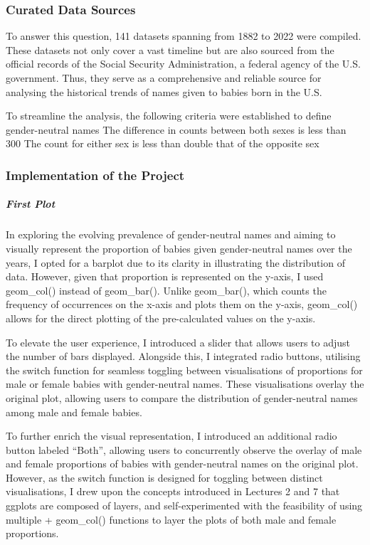 \documentclass[
]{article}
\begin{document}
\hypertarget{curated-data-sources}{%
\subsubsection{Curated Data Sources}\label{curated-data-sources}}

To answer this question, 141 datasets spanning from 1882 to 2022 were
compiled. These datasets not only cover a vast timeline but are also
sourced from the official records of the Social Security Administration,
a federal agency of the U.S. government. Thus, they serve as a
comprehensive and reliable source for analysing the historical trends of
names given to babies born in the U.S.

To streamline the analysis, the following criteria were established to
define gender-neutral names The difference in counts between both sexes
is less than 300 The count for either sex is less than double that of
the opposite sex

\hypertarget{implementation-of-the-project}{%
\subsubsection{Implementation of the
Project}\label{implementation-of-the-project}}

\hypertarget{first-plot}{%
\subparagraph{\texorpdfstring{\textbf{First
Plot}}{First Plot}}\label{first-plot}}

In exploring the evolving prevalence of gender-neutral names and aiming
to visually represent the proportion of babies given gender-neutral
names over the years, I opted for a barplot due to its clarity in
illustrating the distribution of data. However, given that proportion is
represented on the y-axis, I used geom\_col() instead of geom\_bar().
Unlike geom\_bar(), which counts the frequency of occurrences on the
x-axis and plots them on the y-axis, geom\_col() allows for the direct
plotting of the pre-calculated values on the y-axis.

To elevate the user experience, I introduced a slider that allows users
to adjust the number of bars displayed. Alongside this, I integrated
radio buttons, utilising the switch function for seamless toggling
between visualisations of proportions for male or female babies with
gender-neutral names. These visualisations overlay the original plot,
allowing users to compare the distribution of gender-neutral names among
male and female babies.

To further enrich the visual representation, I introduced an additional
radio button labeled ``Both'', allowing users to concurrently observe
the overlay of male and female proportions of babies with gender-neutral
names on the original plot. However, as the switch function is designed
for toggling between distinct visualisations, I drew upon the concepts
introduced in Lectures 2 and 7 that ggplots are composed of layers, and
self-experimented with the feasibility of using multiple + geom\_col()
functions to layer the plots of both male and female proportions.
\end{document}
